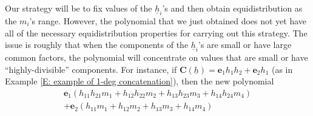 \documentclass[11pt]{amsart}
\theoremstyle{definition}
\newcommand{\bc}{{\mathbf{C}}}
\newcommand{\be}{{\mathbf{e}}}
\newcommand{\uh}{{\underline{h}}}
\newcommand{\BK}[1]{{\color{red}{#1}}}
\begin{document}
Our strategy will be to fix values of the $\uh_i$'s and then obtain equidistribution as the $m_i$'s range.  However, the polynomial that we just obtained does not yet have all of the necessary equidistribution properties for carrying out this strategy.
The issue is roughly that when the components of the $\uh_i$'s are small or have large common factors, the polynomial will concentrate on values that are small or have ``highly-divisible'' components.  For instance, if $\bc(\uh) = \be_1  h_1 h_2+\be_2 h_1$ (as in Example \ref{E: example of 1-deg concatenation}), then the new polynomial
\begin{gather*}
   \be_1 (h_{11} h_{21} m_{1} + h_{12}h_{22}m_{2} + h_{13}h_{23}m_{3}+h_{14}h_{24}m_{4})\\
   + \be_2(h_{11} m_{1} + h_{12}m_{2} + h_{13}m_{3}+h_{14}m_{4})
\end{gather*}
\end{document}
